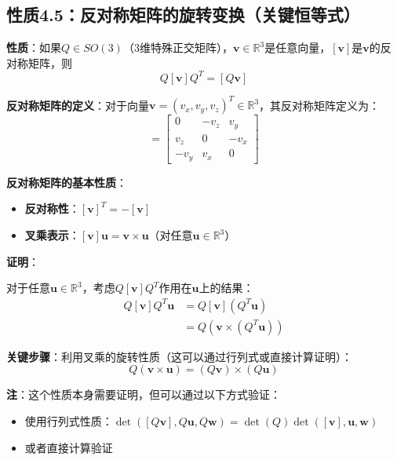 \documentclass[12pt,a4paper]{article}
\begin{document}
\subsection{性质4.5：反对称矩阵的旋转变换（关键恒等式）}

\textbf{性质}：如果$Q \in SO(3)$（3维特殊正交矩阵），$\bm{v} \in \mathbb{R}^3$是任意向量，$[\bm{v}]$是$\bm{v}$的反对称矩阵，则
\begin{equation}
Q[\bm{v}]Q^T = [Q\bm{v}]
\label{eq:skew_rotation_identity}
\end{equation}

\textbf{反对称矩阵的定义}：对于向量$\bm{v} = (v_x, v_y, v_z)^T \in \mathbb{R}^3$，其反对称矩阵定义为：
\begin{equation}
[\bm{v}] = \begin{bmatrix}
0 & -v_z & v_y \\
v_z & 0 & -v_x \\
-v_y & v_x & 0
\end{bmatrix}
\label{eq:skew_definition}
\end{equation}

\textbf{反对称矩阵的基本性质}：
\begin{itemize}
\item \textbf{反对称性}：$[\bm{v}]^T = -[\bm{v}]$
\item \textbf{叉乘表示}：$[\bm{v}] \bm{u} = \bm{v} \times \bm{u}$（对任意$\bm{u} \in \mathbb{R}^3$）
\end{itemize}

\textbf{证明}：

对于任意$\bm{u} \in \mathbb{R}^3$，考虑$Q[\bm{v}]Q^T$作用在$\bm{u}$上的结果：
\begin{align}
Q[\bm{v}]Q^T \bm{u} &= Q[\bm{v}](Q^T \bm{u}) \\
&= Q(\bm{v} \times (Q^T \bm{u}))
\end{align}

\textbf{关键步骤}：利用叉乘的旋转性质（这可以通过行列式或直接计算证明）：
\begin{equation}
Q(\bm{v} \times \bm{u}) = (Q\bm{v}) \times (Q\bm{u})
\label{eq:cross_product_rotation}
\end{equation}

\textbf{注}：这个性质本身需要证明，但可以通过以下方式验证：
\begin{itemize}
\item 使用行列式性质：$\det([Q\bm{v}], Q\bm{u}, Q\bm{w}) = \det(Q) \det([\bm{v}], \bm{u}, \bm{w})$
\item 或者直接计算验证
\end{itemize}
\end{document}
